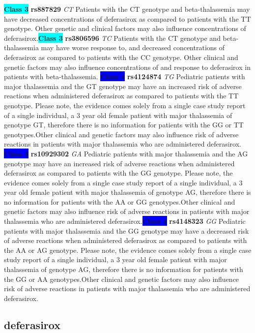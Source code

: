 \documentclass{book}
\begin{document}
\begin{center}
\textbf{\colorbox{cyan} {Class 3}} \textbf{ rs887829 } \textit{ CT }
Patients with the CT genotype and beta-thalassemia may have decreased concentrations of deferasirox as compared to patients with the TT genotype. Other genetic and clinical factors may also influence concentrations of deferasirox.\textbf{\colorbox{cyan} {Class 3}} \textbf{ rs3806596 } \textit{ TC }
Patients with the CT genotype and beta-thalassemia may have worse response to, and decreased concentrations of deferasirox as compared to patients with the CC genotype. Other clinical and genetic factors may also influence concentrations of and response to deferasirox in patients with beta-thalassemia.
\textbf{\colorbox{blue} {Class 4}} \textbf{ rs4124874 } \textit{ TG }
Pediatric patients with major thalassemia and the GT genotype may have an increased risk of adverse reactions when administered deferasirox as compared to patients with the TT genotype. Please note, the evidence comes solely from a single case study report of a single individual, a 3 year old female patient with major thalassemia of genotype GT, therefore there is no information for patients with the GG or TT genotypes.Other clinical and genetic factors may also influence risk of adverse reactions in patients with major thalassemia who are administered deferasirox. \textbf{\colorbox{blue} {Class 4}} \textbf{ rs10929302 } \textit{ GA }
Pediatric patients with major thalassemia and the AG genotype may have an increased risk of adverse reactions when administered deferasirox as compared to patients with the GG genotype. Please note, the evidence comes solely from a single case study report of a single individual, a 3 year old female patient with major thalassemia of genotype AG, therefore there is no information for patients with the AA or GG genotypes.Other clinical and genetic factors may also influence risk of adverse reactions in patients with major thalassemia who are administered deferasirox.\textbf{\colorbox{blue} {Class 4}} \textbf{ rs4148323 } \textit{ GG }
Pediatric patients with major thalassemia and the GG genotype may have a decreased risk of adverse reactions when administered deferasirox as compared to patients with the AA or AG genotype. Please note, the evidence comes solely from a single case study report of a single individual, a 3 year old female patient with major thalassemia of genotype AG, therefore there is no information for patients with the GG or AA genotypes.Other clinical and genetic factors may also influence risk of adverse reactions in patients with major thalassemia who are administered deferasirox.

\end{center}\subsection{ deferasirox }
\end{document}
